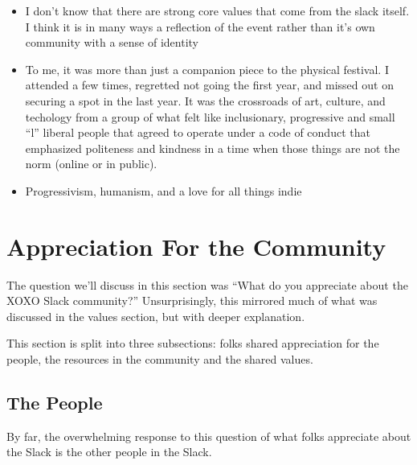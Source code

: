 \documentclass[
]{book}
\providecommand{\tightlist}{%
  \setlength{\itemsep}{0pt}\setlength{\parskip}{0pt}}
\begin{document}
\begin{itemize}
\tightlist
\item
  I don't know that there are strong core values that come from the slack itself. I think it is in many ways a reflection of the event rather than it's own community with a sense of identity
\item
  To me, it was more than just a companion piece to the physical festival. I attended a few times, regretted not going the first year, and missed out on securing a spot in the last year. It was the crossroads of art, culture, and techology from a group of what felt like inclusionary, progressive and small ``l'' liberal people that agreed to operate under a code of conduct that emphasized politeness and kindness in a time when those things are not the norm (online or in public).
\item
  Progressivism, humanism, and a love for all things indie
\end{itemize}

\chapter{Appreciation For the Community}\label{appreciation-for-the-community}

The question we'll discuss in this section was ``What do you appreciate about the XOXO Slack community?'' Unsurprisingly, this mirrored much of what was discussed in the values section, but with deeper explanation.

This section is split into three subsections: folks shared appreciation for the people, the resources in the community and the shared values.

\section{The People}\label{the-people}

By far, the overwhelming response to this question of what folks appreciate about the Slack is the other people in the Slack.
\end{document}
